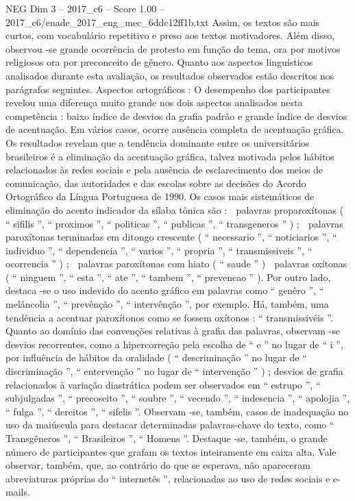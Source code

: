 \begin{textsample}{NEG Dim 3 – 2017\_c6 – Score 1.00 – 2017\_c6/enade\_2017\_eng\_mec\_6ddc12ff1b.txt}
Assim, os textos são mais curtos, com vocabulário repetitivo e preso aos textos motivadores.
Além disso, observou -se grande ocorrência de protesto em função do tema, ora por motivos religiosos ora por preconceito de gênero.
Quanto aos aspectos linguísticos analisados durante esta avaliação, os resultados observados estão descritos nos parágrafos seguintes.
Aspectos ortográficos : O desempenho dos participantes revelou uma diferença muito grande nos dois aspectos analisados nesta competência : baixo índice de desvios da grafia padrão e grande índice de desvios de acentuação.
Em vários casos, ocorre ausência completa de acentuação gráfica.
Os resultados revelam que a tendência dominante entre os universitários brasileiros é a eliminação da acentuação gráfica, talvez motivada pelos hábitos relacionados às redes sociais e pela ausência de esclarecimento dos meios de comunicação, das autoridades e das escolas sobre as decisões do Acordo Ortográfico da Língua Portuguesa de 1990.
Os casos mais sistemáticos de eliminação do acento indicador da sílaba tônica são :  palavras proparoxítonas ( “ sifilis ”, “ proximos ”, “ politicas ”, “ publicas ”, “ transgeneros ” ) ;  palavras paroxítonas terminadas em ditongo crescente ( “ necessario ”, “ noticiarios ”, “ individuo ”, “ dependencia ”, “ varios ”, “ propria ”, “ transmissiveis ”, “ ocorrencia ” ) ;  palavras paroxítonas com hiato ( “ saude ” )  palavras oxítonas ( “ ninguem ”, “ esta ”, “ ate ”, “ tambem ”, “ prevencao ” ).
Por outro lado, destaca -se o uso indevido do acento gráfico em palavras como “ genêro ”, “ melâncolia ”, “ prevênção ”, “ intervênção ”, por exemplo.
Há, também, uma tendência a acentuar paroxítonos como se fossem oxítonos : “ transmissivéis ”.
Quanto ao domínio das convenções relativas à grafia das palavras, observam -se desvios recorrentes, como a hipercorreção pela escolha de “ e ” no lugar de “ i ”, por influência de hábitos da oralidade ( “ descriminação ” no lugar de “ discriminação ”, “ entervenção ” no lugar de “ intervenção ” ) ; desvios de grafia relacionados à variação diastrática podem ser observados em “ estrupo ”, “ subjulgadas ”, “ precoseito ”, “ soubre ”, “ vecendo ”, “ indesencia ”, “ apolojia ”, “ fulga ”, “ dereitos ”, “ sifelis ”.
Observam -se, também, casos de inadequação no uso da maiúscula para destacar determinadas palavras-chave do texto, como “ Transgêneros ”, “ Brasileiros ”, “ Homens ”.
Destaque -se, também, o grande número de participantes que grafam os textos inteiramente em caixa alta.
Vale observar, também, que, ao contrário do que se esperava, não apareceram abreviaturas próprias do “ internetês ”, relacionadas ao uso de redes sociais e e-mails.

\end{textsample}
